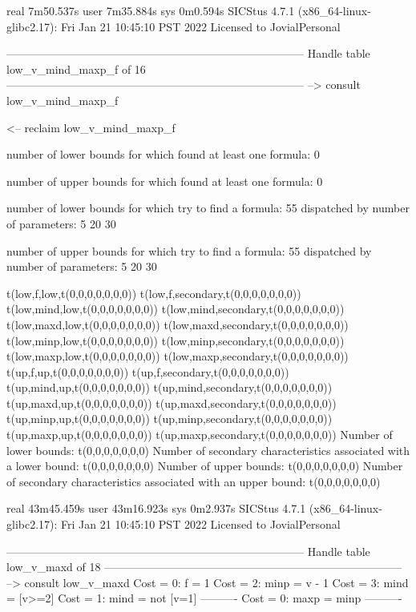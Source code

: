 real	7m50.537s
user	7m35.884s
sys	0m0.594s
SICStus 4.7.1 (x86_64-linux-glibc2.17): Fri Jan 21 10:45:10 PST 2022
Licensed to JovialPersonal


--------------------------------------------------------------------------------
Handle table low_v_mind_maxp_f of 16
--------------------------------------------------------------------------------
--> consult low_v_mind_maxp_f

<-- reclaim low_v_mind_maxp_f

number of lower bounds for which found at least one formula: 0

number of upper bounds for which found at least one formula: 0

number of lower bounds for which try to find a formula: 55
dispatched by number of parameters: 5  20  30

number of upper bounds for which try to find a formula: 55
dispatched by number of parameters: 5  20  30

t(low,f,low,t(0,0,0,0,0,0,0))
t(low,f,secondary,t(0,0,0,0,0,0,0))
t(low,mind,low,t(0,0,0,0,0,0,0))
t(low,mind,secondary,t(0,0,0,0,0,0,0))
t(low,maxd,low,t(0,0,0,0,0,0,0))
t(low,maxd,secondary,t(0,0,0,0,0,0,0))
t(low,minp,low,t(0,0,0,0,0,0,0))
t(low,minp,secondary,t(0,0,0,0,0,0,0))
t(low,maxp,low,t(0,0,0,0,0,0,0))
t(low,maxp,secondary,t(0,0,0,0,0,0,0))
t(up,f,up,t(0,0,0,0,0,0,0))
t(up,f,secondary,t(0,0,0,0,0,0,0))
t(up,mind,up,t(0,0,0,0,0,0,0))
t(up,mind,secondary,t(0,0,0,0,0,0,0))
t(up,maxd,up,t(0,0,0,0,0,0,0))
t(up,maxd,secondary,t(0,0,0,0,0,0,0))
t(up,minp,up,t(0,0,0,0,0,0,0))
t(up,minp,secondary,t(0,0,0,0,0,0,0))
t(up,maxp,up,t(0,0,0,0,0,0,0))
t(up,maxp,secondary,t(0,0,0,0,0,0,0))
Number of lower bounds:                                             t(0,0,0,0,0,0,0)
Number of secondary characteristics associated with a lower bound:  t(0,0,0,0,0,0,0)
Number of upper bounds:                                             t(0,0,0,0,0,0,0)
Number of secondary characteristics associated with an upper bound: t(0,0,0,0,0,0,0)

real	43m45.459s
user	43m16.923s
sys	0m2.937s
SICStus 4.7.1 (x86_64-linux-glibc2.17): Fri Jan 21 10:45:10 PST 2022
Licensed to JovialPersonal


--------------------------------------------------------------------------------
Handle table low_v_maxd of 18
--------------------------------------------------------------------------------
--> consult low_v_maxd
Cost =  0:  f    = 1
Cost =  2:  minp = v - 1
Cost =  3:  mind = [v>=2]
Cost =  1:  mind = not [v=1]
----------
Cost =  0:  maxp = minp
----------

